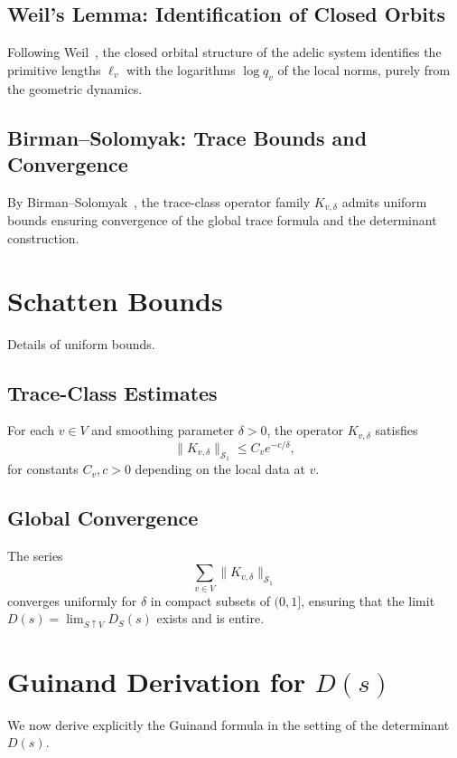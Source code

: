 \documentclass[12pt]{article}
\begin{document}
\subsection{Weil's Lemma: Identification of Closed Orbits}

Following Weil~\cite{Weil1964}, the closed orbital structure of the adelic system identifies the primitive lengths $\ell_v$ with the logarithms $\log q_v$ of the local norms, purely from the geometric dynamics.

\subsection{Birman--Solomyak: Trace Bounds and Convergence}

By Birman--Solomyak~\cite{BirmanSolomyak1967,birman2003}, the trace-class operator family $K_{v,\delta}$ admits uniform bounds ensuring convergence of the global trace formula and the determinant construction.

\section{Schatten Bounds}

Details of uniform bounds.

\subsection{Trace-Class Estimates}

For each $v \in V$ and smoothing parameter $\delta > 0$, the operator $K_{v,\delta}$ satisfies
\[
\|K_{v,\delta}\|_{\mathcal{S}_1} \leq C_v e^{-c/\delta},
\]
for constants $C_v, c > 0$ depending on the local data at $v$.

\subsection{Global Convergence}

The series
\[
\sum_{v \in V} \|K_{v,\delta}\|_{\mathcal{S}_1}
\]
converges uniformly for $\delta$ in compact subsets of $(0, 1]$, ensuring that the limit $D(s) = \lim_{S \uparrow V} D_S(s)$ exists and is entire.

\section{Guinand Derivation for \texorpdfstring{$D(s)$}{D(s)}}

We now derive explicitly the Guinand formula in the setting of the determinant $D(s)$.
\end{document}
